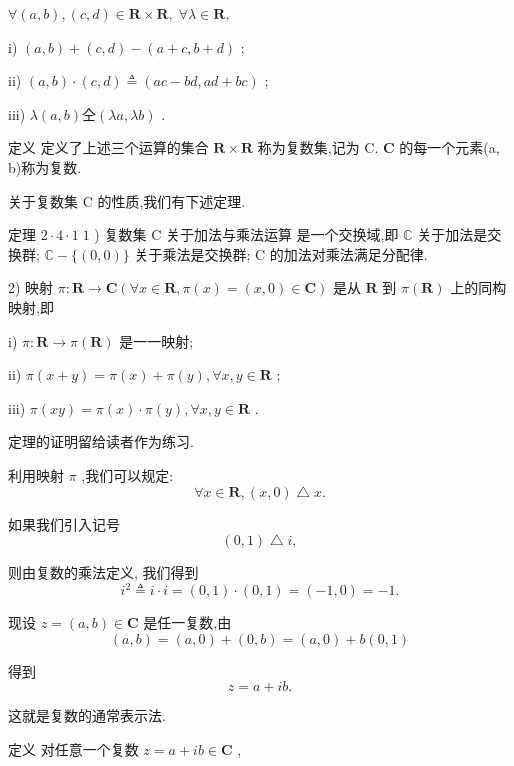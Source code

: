 $\forall \left( {a,b}\right) ,\left( {c,d}\right)  \in  \mathbf{R} \times  \mathbf{R},\;\forall \lambda  \in  \mathbf{R},$

i) $\left( {a,b}\right)  + \left( {c,d}\right)  - \left( {a + c,b + d}\right)$ ;

ii) $\left( {a,b}\right)  \cdot  \left( {c,d}\right)  \triangleq  \left( {{ac} - {bd},{ad} + {bc}}\right)$ ;

iii) $\lambda \left( {a,b}\right)  仝 \left( {{\lambda a},{\lambda b}}\right)$ .

定义 定义了上述三个运算的集合 $\mathbf{R} \times  \mathbf{R}$ 称为复数集,记为 C. $\mathbf{C}$ 的每一个元素(a, b)称为复数.

关于复数集 $\mathrm{C}$ 的性质,我们有下述定理.

定理 $2 \cdot  4 \cdot  1\;1$ ) 复数集 $\mathrm{C}$ 关于加法与乘法运算 是一个交换域,即 $\mathbb{C}$ 关于加法是交换群; $\mathbb{C} - \{ \left( {0,0}\right) \}$ 关于乘法是交换群; $\mathrm{C}$ 的加法对乘法满足分配律.

2) 映射 $\pi  : \mathbf{R} \rightarrow  \mathbf{C}\left( {\forall x \in  \mathbf{R},\pi \left( x\right)  = \left( {x,0}\right)  \in  \mathbf{C}}\right)$ 是从 $\mathbf{R}$ 到 $\pi \left( \mathbf{R}\right)$ 上的同构映射,即

i) $\pi  : \mathbf{R} \rightarrow  \pi \left( \mathbf{R}\right)$ 是一一映射;

ii) $\pi \left( {x + y}\right)  = \pi \left( x\right)  + \pi \left( y\right) ,\forall x,y \in  \mathbf{R}$ ;

iii) $\pi \left( {xy}\right)  = \pi \left( x\right)  \cdot  \pi \left( y\right) ,\forall x,y \in  \mathbf{R}$ .

定理的证明留给读者作为练习.

利用映射 $\pi$ ,我们可以规定:
$$\forall x \in  \mathbf{R},\left( {x,0}\right)  \bigtriangleup  x.$$

如果我们引入记号
$$\left( {0,1}\right)  \bigtriangleup  i,$$

则由复数的乘法定义, 我们得到
$${i}^{2} \triangleq  i \cdot  i = \left( {0,1}\right)  \cdot  \left( {0,1}\right)  = \left( {-1,0}\right)  =  - 1.$$

现设 $z = \left( {a,b}\right)  \in  \mathbf{C}$ 是任一复数,由
$$\left( {a,b}\right)  = \left( {a,0}\right)  + \left( {0,b}\right)  = \left( {a,0}\right)  + b\left( {0,1}\right)$$

得到
$$z = a + {ib}.$$

这就是复数的通常表示法.

定义 对任意一个复数 $z = a + {ib} \in  \mathbf{C}$ ,

